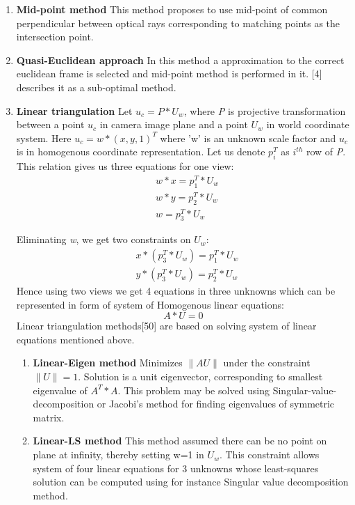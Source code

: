 \begin{enumerate}
\item \textbf{Mid-point method}\newline
\noindent 
This method proposes to use mid-point of common perpendicular between optical rays corresponding to matching points as the intersection point.  
\\
\item \textbf{Quasi-Euclidean approach}\newline
\noindent
In this method a approximation to the correct euclidean frame is selected and mid-point method is performed in it. [4] describes it as a sub-optimal method.

\item \textbf{Linear triangulation}\newline
\noindent
Let $u_c=P*U_w$, where \textit{P} is projective transformation between a point $u_c$ in camera image plane and a point $U_w$ in world coordinate system. Here $u_c=w*(x,y,1)^T$ where 'w' is an unknown scale factor and $u_c$ is in homogenous coordinate representation. Let us denote $p_i^T$ as $i^{th}$ row of \textit{P}. This relation gives us three equations for one view:
\begin{equation}
\begin{aligned}
& w*x=p_1^T*U_w \\
& w*y=p_2^T*U_w \\
& w=p_3^T*U_w
\end{aligned}
\end{equation}

\noindent
Eliminating \textit{w}, we get two constraints on $U_w$:
\begin{equation}
\begin{aligned}
& x*(p_3^T*U_w)=p_1^T*U_w \\
& y*(p_3^T*U_w)=p_2^T*U_w
\end{aligned}
\end{equation}
\noindent
Hence using two views we get 4 equations in three unknowns which can be represented in form of system of Homogenous linear equations:
\begin{equation}
A*U=0
\end{equation}
Linear triangulation methods[50] are based on solving system of linear equations mentioned above.
\begin{enumerate}
\item \textbf{Linear-Eigen method}\newline
\noindent
Minimizes $\|AU\|$ under the constraint $\|U\|=1$. Solution is a unit eigenvector, corresponding to smallest eigenvalue of $A^T*A$. This problem may be solved using Singular-value-decomposition or Jacobi's method for finding eigenvalues of symmetric matrix.\item \textbf{Linear-LS method}\newline
\noindent
This method assumed there can be no point on plane at infinity, thereby setting w=1 in $U_w$. This constraint allows system of four linear equations for 3 unknowns whose least-squares solution can be computed using for instance Singular value decomposition method.
\end{enumerate}


\end{enumerate}

